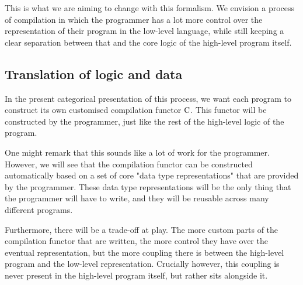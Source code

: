 This is what we are aiming to change with this formalism. We envision a process
of compilation in which the programmer has a lot more control over the
representation of their program in the low-level language, while still keeping
a clear separation between that and the core logic of the high-level program
itself.

\subsection{Translation of logic and data}

In the present categorical presentation of this process, we want each program
to construct its own customised compilation functor $\mathrm C$. This functor will
be constructed by the programmer, just like the rest of the high-level logic of
the program.

One might remark that this sounds like a lot of work for the programmer.
However, we will see that the compilation functor can be constructed
automatically based on a set of core "data type representations" that are
provided by the programmer. These data type representations will be the only
thing that the programmer will have to write, and they will be reusable across
many different programs.

Furthermore, there will be a trade-off at play. The more custom parts of the
compilation functor that are written, the more control they have over the
eventual representation, but the more coupling there is between the high-level
program and the low-level representation. Crucially however, this coupling is
never present in the high-level program itself, but rather sits alongside it.
